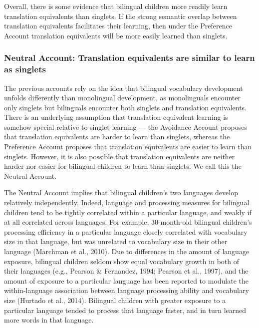 \documentclass[
  english,
  ,man,floatsintext]{apa6}
\begin{document}
Overall, there is some evidence that bilingual children more readily learn translation equivalents than singlets. If the strong semantic overlap between translation equivalents facilitates their learning, then under the Preference Account translation equivalents will be more easily learned than singlets.

\hypertarget{neutral-account-translation-equivalents-are-similar-to-learn-as-singlets}{%
\subsubsection{Neutral Account: Translation equivalents are similar to learn as singlets}\label{neutral-account-translation-equivalents-are-similar-to-learn-as-singlets}}

The previous accounts rely on the idea that bilingual vocabulary development unfolds differently than monolingual development, as monolinguals encounter only singlets but bilinguals encounter both singlets and translation equivalents. There is an underlying assumption that translation equivalent learning is somehow special relative to singlet learning --- the Avoidance Account proposes that translation equivalents are harder to learn than singlets, whereas the Preference Account proposes that translation equivalents are easier to learn than singlets. However, it is also possible that translation equivalents are neither harder nor easier for bilingual children to learn than singlets. We call this the Neutral Account.

The Neutral Account implies that bilingual children's two languages develop relatively independently. Indeed, language and processing measures for bilingual children tend to be tightly correlated within a particular language, and weakly if at all correlated across languages. For example, 30-month-old bilingual children's processing efficiency in a particular language closely correlated with vocabulary size in that language, but was unrelated to vocabulary size in their other language (Marchman et al., 2010). Due to differences in the amount of language exposure, bilingual children seldom show equal vocabulary growth in both of their languages (e.g., Pearson \& Fernandez, 1994; Pearson et al., 1997), and the amount of exposure to a particular language has been reported to modulate the within-language association between language processing ability and vocabulary size (Hurtado et al., 2014). Bilingual children with greater exposure to a particular language tended to process that language faster, and in turn learned more words in that language.
\end{document}
